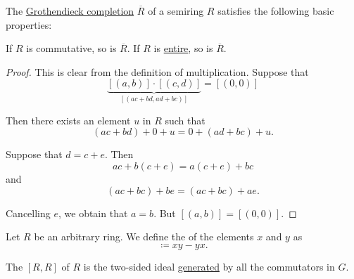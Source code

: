 \begin{proposition}\label{thm:def:grothendieck_semiring_completion}
  The \hyperref[thm:grothendieck_semiring_completion]{Grothendieck completion} \( \overline{R} \) of a semiring \( R \) satisfies the following basic properties:
  \begin{thmenum}
     If \( R \) is commutative, so is \( \overline{R} \).
     If \( R \) is \hyperref[def:divisibility/zero]{entire}, so is \( \overline{R} \).
  \end{thmenum}
\end{proposition}
\begin{proof}
   This is clear from the definition of multiplication.
   Suppose that
  \begin{equation*}
    \underbrace{[(a, b)] \cdot [(c, d)]}_{[(ac + bd, ad + bc)]} = [(0, 0)]
  \end{equation*}

  Then there exists an element \( u \) in \( R \) such that
  \begin{equation*}
    (ac + bd) + 0 + u = 0 + (ad + bc) + u.
  \end{equation*}

  Suppose that \( d = c + e \). Then
  \begin{equation*}
    ac + b(c + e) = a(c + e) + bc
  \end{equation*}
  and
  \begin{equation*}
    (ac + bc) + be = (ac + bc) + ae.
  \end{equation*}

  Cancelling \( e \), we obtain that \( a = b \). But \( [(a, b)] = [(0, 0)] \).
\end{proof}

\begin{definition}\label{def:ring_commutator}
  Let \( R \) be an arbitrary ring. We define the  of the elements \( x \) and \( y \) as
  \begin{equation*}
    [x, y] \coloneqq xy - yx.
  \end{equation*}

  The  \( [R, R] \) of \( R \) is the two-sided ideal \hyperref[def:semiring_ideal/generated]{generated} by all the commutators in \( G \).
\end{definition}

